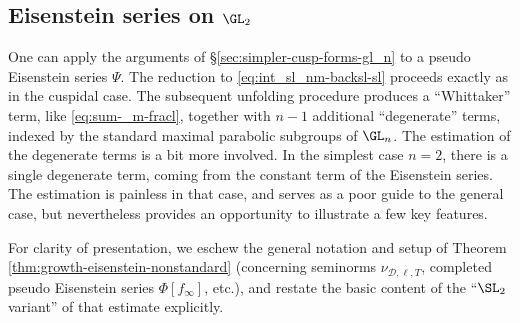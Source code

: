 \subsection{Eisenstein series on $\GL_2$}\label{sec:cnjgglqbxq}
One can apply the arguments of \S\ref{sec:simpler-cusp-forms-gl_n} to a pseudo Eisenstein series $\Psi$.  The reduction to \eqref{eq:int_sl_nm-backsl-sl} proceeds exactly as in the cuspidal case.  The subsequent unfolding procedure produces a ``Whittaker'' term, like \eqref{eq:sum-_m-fracl}, together with $n-1$ additional ``degenerate'' terms, indexed by the standard maximal parabolic subgroups of $\GL_n$.  The estimation of the degenerate terms is a bit more involved.  In the simplest case $n=2$, there is a single degenerate term, coming from the constant term of the Eisenstein series.  The estimation is painless in that case, and serves as a poor guide to the general case, but nevertheless provides an opportunity to illustrate a few key features.

For clarity of presentation, we eschew the general notation and setup of Theorem \ref{thm:growth-eisenstein-nonstandard} (concerning seminorms $\nu_{\mathcal{D},\ell,T}$, completed pseudo Eisenstein series $\Phi[f_\infty]$, etc.), and restate the basic content of the ``$\SL_2$ variant'' of that estimate explicitly.


